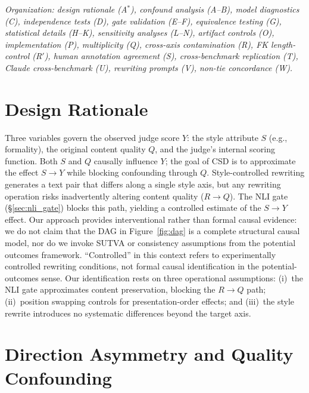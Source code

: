 \appendix

\noindent\emph{Organization: design rationale (A$^*$), confound analysis (A--B), model diagnostics (C), independence tests (D), gate validation (E--F), equivalence testing (G), statistical details (H--K), sensitivity analyses (L--N), artifact controls (O), implementation (P), multiplicity (Q), cross-axis contamination (R), FK length-control (R$'$), human annotation agreement (S), cross-benchmark replication (T), Claude cross-benchmark (U), rewriting prompts (V), non-tie concordance (W).}

\section{Design Rationale}
\label{app:design_rationale}

Three variables govern the observed judge score $Y$: the style attribute $S$ (e.g., formality), the original content quality $Q$, and the judge's internal scoring function.
Both $S$ and $Q$ causally influence $Y$; the goal of CSD is to approximate the effect $S \to Y$ while blocking confounding through $Q$.
Style-controlled rewriting generates a text pair that differs along a single style axis, but any rewriting operation risks inadvertently altering content quality ($R \to Q$).
The NLI gate (\S\ref{sec:nli_gate}) blocks this path, yielding a controlled estimate of the $S \to Y$ effect.
Our approach provides interventional rather than formal causal evidence: we do not claim that the DAG in Figure~\ref{fig:dag} is a complete structural causal model, nor do we invoke SUTVA or consistency assumptions from the potential outcomes framework.
``Controlled'' in this context refers to experimentally controlled rewriting conditions, not formal causal identification in the potential-outcomes sense.
Our identification rests on three operational assumptions: (i)~the NLI gate approximates content preservation, blocking the $R \to Q$ path; (ii)~position swapping controls for presentation-order effects; and (iii)~the style rewrite introduces no systematic differences beyond the target axis.

\section{Direction Asymmetry and Quality Confounding}
\label{app:direction}

